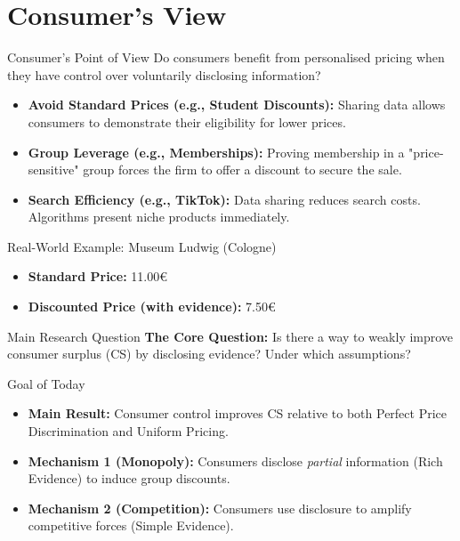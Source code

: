 \documentclass{beamer}
\begin{document}
\section{Consumer's View}
\begin{frame}{Consumer's Point of View}
    Do consumers benefit from personalised pricing when they have control over voluntarily disclosing information?

    \begin{itemize}
        \setlength\itemsep{1em}
        \item<2-> \textbf{Avoid Standard Prices (e.g., Student Discounts):}
        Sharing data allows consumers to demonstrate their eligibility for lower prices.
        
        \item<3-> \textbf{Group Leverage (e.g., Memberships):}
        Proving membership in a "price-sensitive" group forces the firm to offer a discount to secure the sale.
        
        \item<4-> \textbf{Search Efficiency (e.g., TikTok):}
        Data sharing reduces search costs. Algorithms present niche products immediately.
    \end{itemize}

    \vspace{0.4cm}

    \begin{exampleblock}{Real-World Example: Museum Ludwig (Cologne)}
        \begin{itemize}
            \item \textbf{Standard Price:} 11.00€
            \item \textbf{Discounted Price (with evidence):} 7.50€
        \end{itemize}
    \end{exampleblock}
\end{frame}

\begin{frame}{Main Research Question}
    \textbf{The Core Question:} Is there a way to weakly improve consumer surplus (CS) by disclosing evidence? Under which assumptions?

    \vspace{0.5cm}

    \begin{block}{Goal of Today}
    \begin{itemize}
        \item \textbf{Main Result:} Consumer control improves CS relative to both Perfect Price Discrimination and Uniform Pricing.
        \item \textbf{Mechanism 1 (Monopoly):} Consumers disclose \textit{partial} information (Rich Evidence) to induce group discounts.
        \item \textbf{Mechanism 2 (Competition):} Consumers use disclosure to amplify competitive forces (Simple Evidence).
    \end{itemize}
    \end{block}
\end{frame}
\end{document}
